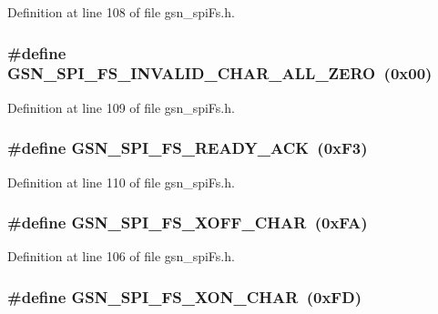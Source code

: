 Definition at line 108 of file gsn\_\-spiFs.h.

\hypertarget{a00589_a9a050ad044f5bc765e6c7f9a61b8939a}{
\subsubsection[{GSN\_\-SPI\_\-FS\_\-INVALID\_\-CHAR\_\-ALL\_\-ZERO}]{\setlength{\rightskip}{0pt plus 5cm}\#define GSN\_\-SPI\_\-FS\_\-INVALID\_\-CHAR\_\-ALL\_\-ZERO~(0x00)}}
\label{a00589_a9a050ad044f5bc765e6c7f9a61b8939a}


Definition at line 109 of file gsn\_\-spiFs.h.

\hypertarget{a00589_a1e6c69b9e22982253a2f60606f5f822b}{
\subsubsection[{GSN\_\-SPI\_\-FS\_\-READY\_\-ACK}]{\setlength{\rightskip}{0pt plus 5cm}\#define GSN\_\-SPI\_\-FS\_\-READY\_\-ACK~(0xF3)}}
\label{a00589_a1e6c69b9e22982253a2f60606f5f822b}


Definition at line 110 of file gsn\_\-spiFs.h.

\hypertarget{a00589_a12c2ba9d783631bc6075f1f8edb9e86e}{
\subsubsection[{GSN\_\-SPI\_\-FS\_\-XOFF\_\-CHAR}]{\setlength{\rightskip}{0pt plus 5cm}\#define GSN\_\-SPI\_\-FS\_\-XOFF\_\-CHAR~(0xFA)}}
\label{a00589_a12c2ba9d783631bc6075f1f8edb9e86e}


Definition at line 106 of file gsn\_\-spiFs.h.

\hypertarget{a00589_af60bde658bec4d3ef49b90312527b19a}{
\subsubsection[{GSN\_\-SPI\_\-FS\_\-XON\_\-CHAR}]{\setlength{\rightskip}{0pt plus 5cm}\#define GSN\_\-SPI\_\-FS\_\-XON\_\-CHAR~(0xFD)}}
\label{a00589_af60bde658bec4d3ef49b90312527b19a}


